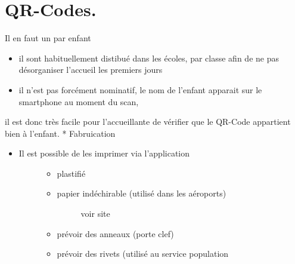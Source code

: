\documentclass[letterpaper,10pt,english]{sphinxmanual}
\begin{document}
\section{QR-Codes.}
\label{checklist:qr-codes}
Il en faut un par enfant
\begin{itemize}
\item {} 
il sont habituellement distibué dans les écoles, par classe afin de ne pas désorganiser l'accueil les premiers jours

\item {} 
il n'est pas forcément nominatif, le nom de l'enfant apparait sur le smartphone au moment du scan,

\end{itemize}

il est donc très facile pour l'accueillante de vérifier que le QR-Code appartient bien à l'enfant.
* Fabruication
\begin{itemize}
\item {} \begin{description}
\item[{Il est possible de les imprimer via l'application}] \leavevmode\begin{itemize}
\item {} 
plastifié

\item {} \begin{description}
\item[{papier indéchirable (utilisé dans les aéroports)}] \leavevmode
voir site

\end{description}

\item {} 
prévoir des anneaux (porte clef)

\item {} 
prévoir des rivets (utilisé au service population

\end{itemize}

\end{description}

\end{itemize}
\end{document}
